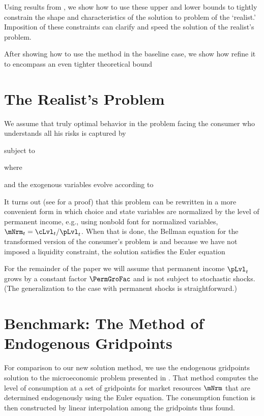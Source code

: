 \documentclass[titlepage, headings=optiontotocandhead]{econtex}
\begin{document}
Using results from \cite{BufferStockTheory}, we show how to use these upper and lower bounds to tightly constrain the shape and characteristics of the solution to problem of the `realist.'  Imposition of these constraints can clarify and speed the solution of the realist's problem.

After showing how to use the method in the baseline case, we show how refine it to encompass an even tighter theoretical bound

\hypertarget{the-realists-problem}{}
\section{The Realist's Problem}

We assume that truly optimal behavior in the problem facing the consumer who understands all his risks is captured by

subject to

where

and the exogenous variables evolve according to 


It turns out (see \cite{SolvingMicroDSOPs} for a proof) that this problem can be rewritten in a more convenient form in which choice and state variables are normalized by the level of permanent income, e.g., using nonbold font for normalized variables, $\mNrm_{t}=\cLvl_{t}/\pLvl_{t}$.  When that is done, the Bellman equation for the transformed version of the consumer's problem is  and because we have not imposed a liquidity constraint, the solution satisfies the Euler equation 

For the remainder of the paper we will assume that permanent income $\pLvl_{t}$ grows by a constant factor $\PermGroFac$ and is not subject to stochastic shocks.  (The generalization to the case with permanent shocks is straightforward.)

\hypertarget{benchmark}{}
\section{Benchmark: The Method of Endogenous Gridpoints}

For comparison to our new solution method, we use the endogenous gridpoints solution to the microeconomic problem presented in \cite{carrollEGM}.  That method computes the level of consumption at a set of gridpoints for market resources $\mNrm$ that are determined endogenously using the Euler equation.  The consumption function is then constructed by linear interpolation among the gridpoints thus found.
\end{document}
